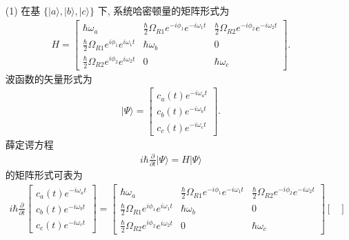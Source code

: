 \documentclass{assignment}
\begin{document}
\begin{sol}
    \begin{itemize}
        \item[(1)] 在基 $\{\lvert a\rangle,\lvert b\rangle,\lvert c\rangle\}$ 下, 系统哈密顿量的矩阵形式为
        \begin{align}
            H=\begin{bmatrix}
                \hbar\omega_a&\frac{\hbar}{2}\Omega_{R1}e^{-i\phi_1}e^{-i\omega_1t}&\frac{\hbar}{2}\Omega_{R2}e^{-i\phi_2}e^{-i\omega_2t}\\
                \frac{\hbar}{2}\Omega_{R1}e^{i\phi_1}e^{i\omega_1t}&\hbar\omega_b&0\\
                \frac{\hbar}{2}\Omega_{R2}e^{i\phi_2}e^{i\omega_2t}&0&\hbar\omega_c
            \end{bmatrix}.
        \end{align}
        波函数的矢量形式为
        \begin{align}
            \lvert\Psi\rangle=\begin{bmatrix}
                c_a(t)e^{-i\omega_at}\\
                c_b(t)e^{-i\omega_bt}\\
                c_c(t)e^{-i\omega_ct}
            \end{bmatrix}.
        \end{align}
        薛定谔方程
        \begin{align}
            i\hbar\frac{\partial}{\partial t}\lvert\Psi\rangle=H\lvert\Psi\rangle
        \end{align}
        的矩阵形式可表为
        {\small
        \begin{gather}
            i\hbar\frac{\partial}{\partial t}\begin{bmatrix}
                c_a(t)e^{-i\omega_at}\\
                c_b(t)e^{-i\omega_bt}\\
                c_c(t)e^{-i\omega_ct}
            \end{bmatrix}=\begin{bmatrix}
                \hbar\omega_a&\frac{\hbar}{2}\Omega_{R1}e^{-i\phi_1}e^{-i\omega_1t}&\frac{\hbar}{2}\Omega_{R2}e^{-i\phi_2}e^{-i\omega_2t}\\
                \frac{\hbar}{2}\Omega_{R1}e^{i\phi_1}e^{i\omega_1t}&\hbar\omega_b&0\\
                \frac{\hbar}{2}\Omega_{R2}e^{i\phi_2}e^{i\omega_2t}&0&\hbar\omega_c
            \end{bmatrix}\begin{bmatrix}

\end{bmatrix}
\end{gather}}
\end{itemize}
\end{sol}
\end{document}
